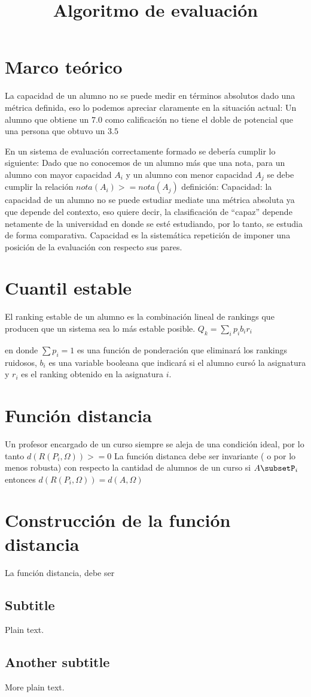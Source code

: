\documentclass{article}
\title{Algoritmo de evaluación}
\begin{document}
\maketitle


\section{Marco teórico}
La capacidad de un alumno no se puede medir en términos absolutos dado una
métrica definida, eso lo podemos apreciar claramente en la situación actual: Un
alumno que obtiene un $7.0$ como calificación no tiene el doble de potencial que
una persona que obtuvo un $3.5$

En un sistema de evaluación correctamente formado se debería cumplir lo
siguiente: Dado que no conocemos de un alumno más que una nota, para un alumno
con mayor capacidad $A_i$ y un alumno con menor capacidad $A_j$ se debe cumplir
la relación
$nota(A_i)>=nota(A_j)$
definición: Capacidad: la capacidad de un alumno no se puede estudiar mediate
una métrica absoluta ya que depende del contexto, eso quiere decir, la
clasificación de ``capaz'' depende netamente de la universidad en donde se esté
estudiando, por lo tanto, se estudia de forma comparativa.
Capacidad es la sistemática repetición de imponer una posición de la evaluación
con respecto sus pares.
\section{Cuantil estable}
El ranking estable de un alumno es la combinación lineal de rankings que
producen que un sistema sea lo más estable posible.
$Q_k = \sum_i p_i b_i r_i$

en donde $\sum p_i = 1$ es una función de ponderación que eliminará los rankings
ruidosos, $b_i$ es una variable booleana que indicará si el alumno cursó la
asignatura y $r_i$ es el ranking obtenido en la asignatura $i$.
\section{Función distancia}
Un profesor encargado de un curso siempre se aleja de una condición ideal, por
lo tanto
$d(R(P_i,\Omega))>=0$
La función distanca debe ser invariante ( o por lo menos robusta) con respecto
la cantidad de alumnos de un curso
 si $A\subsetP_i$ entonces $d(R(P_i,\Omega)) = d(A,\Omega)$

 
 \section{Construcción de la función distancia}
 La función distancia, debe ser
 


\subsection{Subtitle}

Plain text.

\subsection{Another subtitle}

More plain text.
\end{document}
